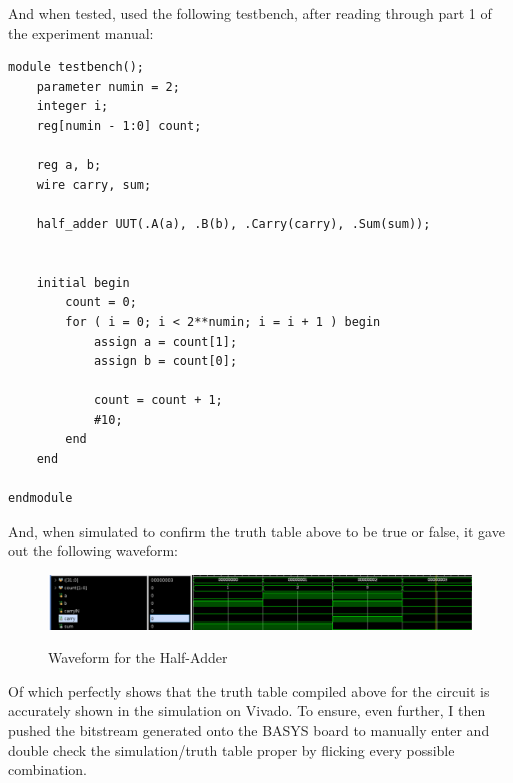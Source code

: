And when tested, used the following testbench, after reading through part 1 of the experiment manual:
\begin{lstlisting}[caption={test}, label={label}, style=Verilog]
module testbench();
    parameter numin = 2;
    integer i;
    reg[numin - 1:0] count;
    
    reg a, b;
    wire carry, sum;
    
    half_adder UUT(.A(a), .B(b), .Carry(carry), .Sum(sum));

    
    initial begin
        count = 0;
        for ( i = 0; i < 2**numin; i = i + 1 ) begin
            assign a = count[1];
            assign b = count[0];
            
            count = count + 1;
            #10;
        end
    end
    
endmodule
\end{lstlisting}
And, when simulated to confirm the truth table above to be true or false, it gave out the following waveform:
\begin{figure}[!htbp]
    \centering
    \caption{Waveform for the Half-Adder}
    \includegraphics[width=1\textwidth]{part-1-half-waveform.png}
    \label{Figure 2}
\end{figure}
Of which perfectly shows that the truth table compiled above for the circuit is accurately shown in the simulation on Vivado. To ensure, even further, I then pushed the bitstream generated onto the BASYS board to manually enter and double check the simulation/truth table proper by flicking every possible combination.
\newpage

